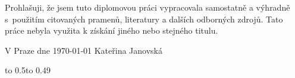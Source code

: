 \noindent
Prohlašuji, že jsem tuto diplomovou práci vypracovala samostatně a výhradně
s~použitím citovaných pramenů, literatury a dalších odborných zdrojů.
Tato práce nebyla využita k získání jiného nebo stejného titulu.


\vspace{10mm}

\noindent
V Praze dne \today
\hspace*{\fill}
Kateřina Janovská
\hspace*{\fill}


\newpage


\openright

\vbox to 0.5\nobreak\vbox to 0.49

\newpage
\openright

\pagestyle{empty}
\tableofcontents

\newpage
\pagestyle{plain}
